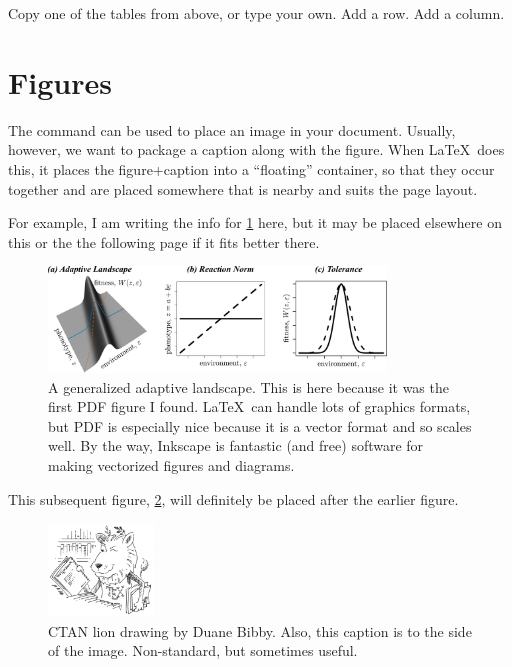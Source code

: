\documentclass{article}
\begin{document}
Copy one of the tables from above, or type your own.
Add a row.
Add a column.

\section{Figures}
\label{sec:figures}

The  command can be used to place an image in your document.
Usually, however, we want to package a caption along with the figure.
When \LaTeX\ does this, it places the figure+caption into a ``floating'' container, so that they occur together and are placed somewhere that is nearby and suits the page layout.

For example, I am writing the info for \cref{fig:landscape} here, but it may be placed elsewhere on this or the the following page if it fits better there.
\begin{figure}
\centering\includegraphics[width=0.8\textwidth]{landscape.pdf}
\caption{A generalized adaptive landscape.
    This is here because it was the first PDF figure I found.
    \LaTeX\ can handle lots of graphics formats, but PDF is especially nice because it is a vector format and so scales well.
    By the way, Inkscape is fantastic (and free) software for making vectorized figures and diagrams.
}
\label{fig:landscape}
\end{figure}

This subsequent figure, \cref{fig:lion}, will definitely be placed after the earlier figure.
\begin{figure}
\includegraphics[width=0.25\textwidth]{lion.png}
\caption{CTAN lion drawing by Duane Bibby.
    Also, this caption is to the side of the image.
    Non-standard, but sometimes useful.
}
\label{fig:lion}
\end{figure}
\end{document}

